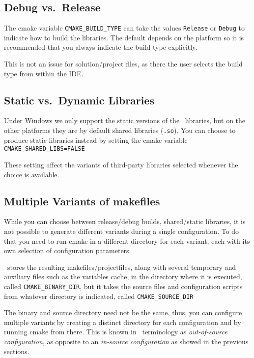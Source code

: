 \subsection{Debug vs.\ Release}

The cmake variable \texttt{CMAKE\_BUILD\_TYPE} can take the values \texttt{Release} or \texttt{Debug} to indicate how to build
the libraries. The default depends on the platform so it is recommended that you always indicate the build type explicitly.

This is not an issue for solution/project files, as there the user selects the build type from within the IDE.

\subsection{Static vs.\ Dynamic Libraries }

Under Windows we only support  the static versions of the \cgal\ libraries, but on the other platforms
they are by default shared libraries ({\tt .so}).
You can choose to produce static libraries instead by setting the cmake variable {\tt CMAKE\_SHARED\_LIBS=FALSE} 

These setting affect the variants of third-party libraries selected whenever the choice is available.

\subsection{Multiple Variants of makefiles}\label{sec:cmake-out-of-source}

While you can choose between release/debug builds, shared/static libraries,
it is not possible to generate different variants during a single configuration. To do that you need to run cmake in a 
different directory for each variant, each with its own selection of configuration parameters.

\cmake\ stores the resulting makefiles/projectfiles, along with several temporary and auxiliary files such
as the variables cache, in the directory where it is executed, called \texttt{CMAKE\_BINARY\_DIR}, but it
takes the source files and configuration scripts from whatever directory is indicated, called
\texttt{CMAKE\_SOURCE\_DIR} 

The binary and source directory need not be the same, thus, you can configure multiple variants by creating a
distinct directory for each configuration and by running cmake from there. This is known in \cmake\ terminology
as  {\em out-of-source configuration}, as opposite to an {\em in-source configuration} as showed in the 
previous sections.

